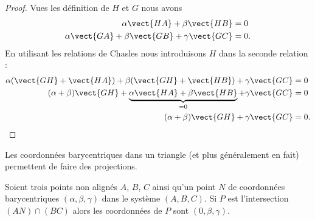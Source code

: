 \begin{proof}
    Vues les définition de \( H\) et \( G\) nous avons
    \begin{subequations}
        \begin{align}
            \alpha\vect{ HA }+\beta\vect{ HB }&=0\\
            \alpha\vect{ GA }+\beta\vect{ GB }+\gamma\vect{ GC }&=0.
        \end{align}
    \end{subequations}
    En utilisant les relations de Chasles nous introduisons \( H\) dans la seconde relation :
    \begin{subequations}
        \begin{align}
            \alpha(\vect{ GH }+\vect{ HA })+\beta(\vect{ GH }+\vect{ HB })+\gamma\vect{ GC }&=0\\
            (\alpha+\beta)\vect{ GH }+\underbrace{  \alpha\vect{ HA }+\beta\vect{ HB }   }_{=0}+\gamma\vect{ GC }&=0\\
            (\alpha+\beta)\vect{ GH }+\gamma\vect{ GC }&=0.
        \end{align}
    \end{subequations}
\end{proof}

Les coordonnées barycentriques dans un triangle (et plus généralement en fait) permettent de faire des projections.

\begin{proposition}     \label{PROPooBCUVooWKttiH}
    Soient trois points non alignés \( A\), \( B\), \( C\) ainsi qu'un point \( N\) de coordonnées barycentriques  \( (\alpha,\beta,\gamma) \) dans le système $(A,B,C)$. Si \( P\) est l'intersection \( (AN)\cap(BC)\) alors les coordonnées de \( P\) sont \( (0,\beta,\gamma)\).
\end{proposition}

